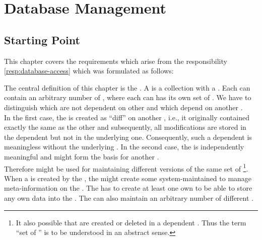 \documentclass[a4paper, 12pt]{book}
\begin{document}
\chapter{Database Management}
\label{sec:database-access}

\section{Starting Point}

This chapter covers the requirements which arise from the responsibility
\vref{resp:database-access} which was formulated as follows:
\begin{quote}
  \respdatabaseaccess
\end{quote}

The central definition of this chapter is the . A
 is a collection  with a
. Each  can contain an arbitrary
number of , where each  can has its own set of
. We have to distinguish  which are not
dependent on other  and  which depend on
another .\\
%
In the first case, the  is created as ``diff'' on another
, i.e., it originally contained exactly the same
 as the other  and subsequently, all
modifications are stored in the dependent  but not in the
underlying one. Consequently, such a dependent  is
meaningless without the underlying .
%
In the second case, the  is independently meaningful and
might form the basis for another .\\
%
Therefore  might be used for maintaining different
versions of the same set of \footnote{It also possible
that  are created or deleted in a dependent
. Thus the term ``set of '' is to be
understood in an abstract sense.}.\\
%
When a  is created by the , the
\SYNEIGHT might create some system-maintained  to
manage meta-information on the . 
%
The  has to create at least one own  to be
able to store any own data into the . The  can
also maintain an arbitrary number of different .
\end{document}
